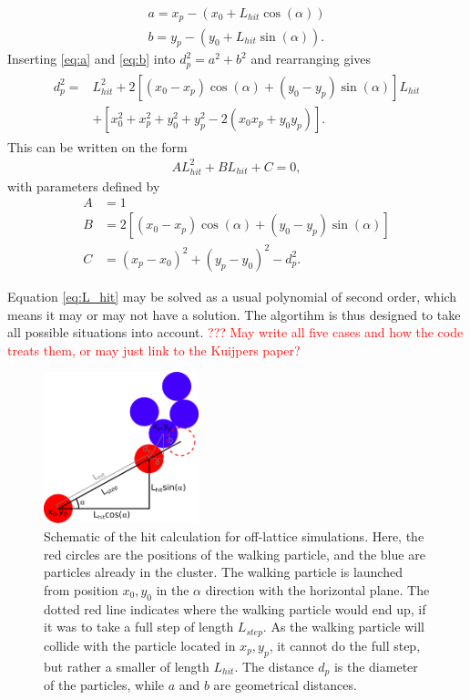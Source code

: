 \begin{align}
a = x_p - (x_0 + L_{hit}\cos(\alpha)) \label{eq:a} \\
b = y_p - (y_0 + L_{hit}\sin(\alpha)).
\label{eq:b}
\end{align} 
Inserting \eqref{eq:a} and \eqref{eq:b} into $d_p^2 = a^2 + b^2$ and rearranging gives
\begin{align}
\begin{split}
d_p^2  = & L_{hit}^2 + 2\left[(x_0 - x_p)\cos(\alpha) + (y_0 - y_p)\sin(\alpha)\right]L_{hit}\\ & + \left[x_0^2 + x_p^2 + y_0^2 + y_p^2 - 2(x_0x_p + y_0y_p)\right].
\end{split}
\end{align}
This can be written on the form
\begin{align}
AL_{hit}^2 + BL_{hit} + C = 0,
\label{eq:L_hit}
\end{align}
with parameters defined by
\begin{align}
A & = 1 \\
B & = 2\left[(x_0 - x_p)\cos(\alpha) + (y_0 - y_p)\sin(\alpha)\right] \\
C & = (x_p - x_0)^2 + (y_p - y_0)^2 - d_p^2.
\end{align}

Equation \eqref{eq:L_hit} may be solved as a usual polynomial of second order, which means it may or may not have a solution. The algortihm is thus designed to take all possible situations into account. \textcolor{red}{??? May write all five cases and how the code treats them, or may just link to the Kuijpers paper?} 

\begin{figure}[h]
	\begin{center}
		\includegraphics[width = 0.4\textwidth]{fig/L_hit.png}
		\caption{Schematic of the hit calculation for off-lattice simulations. Here, the red circles are the positions of the walking particle, and the blue are particles already in the cluster. The walking particle is launched from position $x_0, y_0$ in the $\alpha$ direction with the horizontal plane. The dotted red line indicates where the walking particle would end up, if it was to take a full step of length $L_{step}$. As the walking particle will collide with the particle located in $x_p, y_p$, it cannot do the full step, but rather a smaller of length $L_{hit}$. The distance $d_p$ is the diameter of the particles, while $a$ and $b$ are geometrical distances.}
		\label{fig:L_hit}
	\end{center}
\end{figure}


